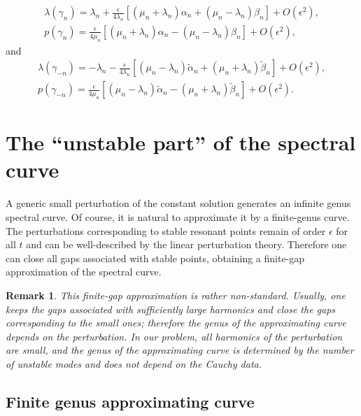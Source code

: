 \documentclass[12pt]{article}
\newtheorem{remark}{Remark}
\begin{document}
\begin{equation}
\label{eq:div_alpha1}
\begin{array}{ll}
\lambda(\gamma_n) = \lambda_n+\frac{\epsilon}{4\lambda_n}\left[(\mu_n+\lambda_n) \alpha_n+ (\mu_n-\lambda_n) \beta_n\right]+O(\epsilon^2), \\
p(\gamma_{n})= \frac{\epsilon}{4\mu_n}\left[(\mu_n+\lambda_n) \alpha_n-(\mu_n-\lambda_n)\beta_n\right]+O(\epsilon^2),
\end{array}
\end{equation}
and
\begin{equation}
\label{eq:div_alpha2}
\begin{array}{ll}
\lambda(\gamma_{-n}) =-\lambda_n-\frac{\epsilon}{4\lambda_n}\left[(\mu_n-\lambda_n) \tilde\alpha_n+ (\mu_n+\lambda_n)\tilde\beta_n\right]+O(\epsilon^2), \\
p(\gamma_{-n})= \frac{\epsilon}{4\mu_n}\left[ (\mu_n-\lambda_n)\tilde\alpha_n- (\mu_n+\lambda_n)\tilde\beta_n\right]+O(\epsilon^2).
\end{array}
\end{equation}

\section{The ``unstable part'' of the spectral curve}
\label{sec:sec5}

A generic small perturbation of the constant solution generates an infinite genus spectral curve. Of course, it is
natural to approximate it by a finite-genus curve. The perturbations corresponding to stable resonant points remain 
of order $\epsilon$ for all $t$ and can be well-described by the linear perturbation theory. Therefore one can close 
all gaps associated with stable points, obtaining a finite-gap approximation of the spectral curve. 

\begin{remark}
This finite-gap approximation is rather non-standard. Usually, one keeps the gaps associated with sufficiently large harmonics and close the gaps corresponding to the small ones; therefore the genus of the approximating curve depends on the perturbation. In our problem, all harmonics of the perturbation are small, and the genus of the approximating curve is determined by the number of unstable modes and does not depend on the Cauchy data.

\end{remark}

\subsection{Finite genus approximating curve}
\end{document}
